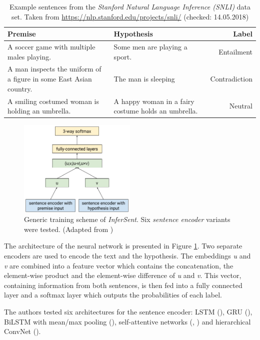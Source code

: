 \begin{table}[ht]
\caption{Example sentences from the \emph{Stanford Natural Language Inference (SNLI)} data set. Taken from \url{https://nlp.stanford.edu/projects/snli/} (checked: 14.05.2018)}
\label{tbl:snli}
\begin{tabularx}{\linewidth}{XXr}
\toprule
Premise & Hypothesis & Label \\ \midrule
A soccer game with multiple males playing. & Some men are playing a sport. & Entailment \\
A man inspects the uniform of a figure in some East Asian country. & The man is sleeping & Contradiction \\
A smiling costumed woman is holding an umbrella. & A happy woman in a fairy costume holds an umbrella. & Neutral \\
\bottomrule
\end{tabularx}
\end{table}


\begin{figure}[ht]
\centering
	\includegraphics[width=0.5\textwidth,scale=0.5]{images/nli}
	\caption{Generic training scheme of \emph{InferSent}. Six \emph{sentence encoder} variants were tested.  (Adapted from \cite{Conneau:2017aa})}
		\label{fig:infersent}
\end{figure}


The architecture of the neural network is presented in Figure \ref{fig:infersent}. Two separate encoders are used to encode the text and the hypothesis. The embeddings \emph{u} and \emph{v} are combined into a feature vector which contains the concatenation, the element-wise product and the element-wise difference of \emph{u} and \emph{v}. This vector, containing information from both sentences, is then fed into a fully connected layer and a softmax layer which outputs the probabilities of each label.

The authors tested six architectures for the sentence encoder: LSTM (\cite{hochreiter1997long}), GRU (\cite{cho2014properties}), BiLSTM with mean/max pooling (\cite{collobert2008unified}), self-attentive networks (\cite{liu2016learning}, \cite{lin2017structured}) and hierarchical ConvNet (\cite{zhao2015self}). 

